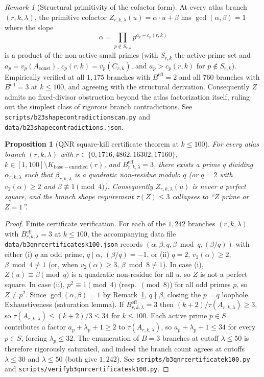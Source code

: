 \documentclass[11pt]{article}
\renewcommand{\_}{\origunderscore\allowbreak}
\newtheorem{proposition}[theorem]{Proposition}
\theoremstyle{definition}
\theoremstyle{remark}
\newtheorem{remark}[theorem]{Remark}
\begin{document}
\begin{remark}[Structural primitivity of the cofactor form]\label{rem:Z_primitive}
At every atlas branch $(r,k,\lambda)$, the primitive cofactor
$Z_{r,k,\lambda}(u) = \alpha\cdot u + \beta$ has
$\gcd(\alpha,\beta)=1$ where the slope
\[
  \alpha = \prod_{p\not\in S_{r,k}} p^{a_p - c_p(r,k)}
\]
is a product of the non-active small primes (with $S_{r,k}$ the
active-prime set and $a_p=v_p(A_{\mathrm{const}})$, $c_p(r,k)=v_p(C_{r,k})$,
and $a_p > c_p(r,k)$ for $p\not\in S_{r,k}$).  Empirically verified at
all $1{,}175$ branches with $B^{\mathrm{eff}}=2$ and all $760$ branches
with $B^{\mathrm{eff}}=3$ at $k\le 100$, and agreeing with the
structural derivation.  Consequently $Z$ admits no fixed-divisor
obstruction beyond the atlas factorization itself, ruling out the
simplest class of rigorous branch contradictions.  See
\texttt{scripts/b23\_shape\_contradiction\_scan.py} and
\texttt{data/b23\_shape\_contradictions.json}.
\end{remark}

\begin{proposition}[QNR square-kill certificate theorem at $k\le 100$]\label{prop:b3_qnr_squarekill}
For every atlas branch $(r,k,\lambda)$ with $r\in\{0,1716,4862,16302,17160\}$,
$k\in[1,100]\setminus K_{\mathrm{base-enriched}}(r)$, and
$B^{\mathrm{eff}}_{r,k,\lambda}=3$, there exists a prime $q$ dividing
$\alpha_{r,k,\lambda}$ such that $\beta_{r,k,\lambda}$ is a quadratic
non-residue modulo $q$ (or $q=2$ with $v_2(\alpha)\ge 2$ and
$\beta\not\equiv 1\pmod 4$).  Consequently $Z_{r,k,\lambda}(u)$ is
never a perfect square, and the branch shape requirement
$\tau(Z)\le 3$ collapses to ``$Z$ prime or $Z=1$''.
\end{proposition}

\begin{proof}
Finite certificate verification.  For each of the $1{,}242$ branches
$(r,k,\lambda)$ with $B^{\mathrm{eff}}_{r,k,\lambda}=3$ at
$k\le 100$, the accompanying data file
\texttt{data/b3\_qnr\_certificates\_k100.json} records
$(\alpha,\beta,q,\beta\bmod q,(\beta/q))$ with either
(i) $q$ an odd prime, $q\mid\alpha$, $(\beta/q)=-1$, or
(ii) $q=2$, $v_2(\alpha)\ge 2$, $\beta\bmod 4\ne 1$ (or, when
$v_2(\alpha)\ge 3$, $\beta\bmod 8\ne 1$).  In case (i),
$Z(u)\equiv\beta\pmod q$ is a quadratic non-residue for all $u$, so
$Z$ is not a perfect square.  In case (ii), $p^2\equiv 1\pmod 4$
(resp.\ $\pmod 8$) for all odd primes $p$, so $Z\ne p^2$.  Since
$\gcd(\alpha,\beta)=1$ by Remark~\ref{rem:Z_primitive}, $q\nmid\beta$,
closing the $p=q$ loophole.  Exhaustiveness (saturation lemma).  If $B^{\mathrm{eff}}_{r,k,\lambda}=3$
then $(k+2)/\tau(A_{r,k,\lambda})\ge 3$, so
$\tau(A_{r,k,\lambda})\le (k+2)/3\le 34$ for $k\le 100$.
Each active prime $p\in S$ contributes a factor $a_p+\lambda_p+1\ge 2$
to $\tau(A_{r,k,\lambda})$, so
$a_p+\lambda_p+1\le 34$ for every $p\in S$, forcing $\lambda_p\le 32$.
The enumeration of $B=3$ branches at cutoff $\lambda\le 50$ is therefore
rigorously saturated, and indeed the branch count agrees at cutoffs
$\lambda\le 30$ and $\lambda\le 50$ (both give $1{,}242$). See
\texttt{scripts/b3\_qnr\_certificate\_k100.py} and
\texttt{scripts/verify\_b3\_qnr\_certificates\_k100.py}.
\end{proof}
\end{document}
